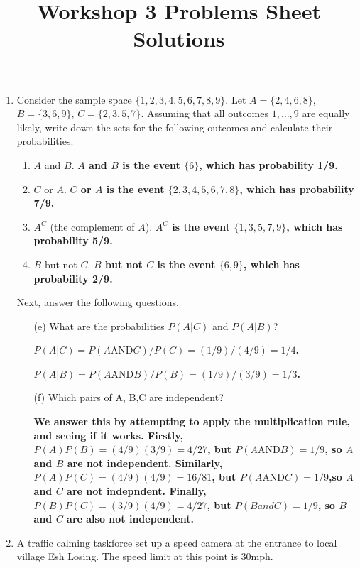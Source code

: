 \documentclass[11pt,a4paper]{article}
\title{Workshop 3 Problems Sheet Solutions}
\begin{document}
 

\setcounter{section}{1}
 



\begin{enumerate}

\item Consider the sample space $\{1, 2, 3, 4, 5, 6, 7, 8, 9\}$. Let $A = \{2, 4, 6, 8\}$, $B = \{3, 6, 9\}$, $C = \{2, 3, 5, 7\}$. Assuming that all outcomes $1,\ldots,9$ are equally likely, write down the sets for the following outcomes and calculate their probabilities.

\begin{enumerate}
\item $A$ and $B$.
\textbf{$A$ and $B$ is the event $\{6\}$, which has probability 1/9.}
\item $C$ or $A$.
\textbf{$C$ or $A$ is the event $\{2, 3, 4, 5, 6, 7, 8\}$, which has probability 7/9.}
\item $A^C$ (the complement of $A$).
\textbf{$A^C$ is the event $\{1, 3, 5, 7, 9\}$, which has probability 5/9.}
\item $B$ but not $C$.
\textbf{$B$ but not $C$ is the event $\{6, 9\}$, which has probability 2/9.}
\end{enumerate}

Next, answer the following questions.
\begin{enumerate}
\item[(e)] What are the probabilities $P(A|C)$ and $P(A|B)$?

\textbf{$P(A|C) = P (A \textrm{AND} C )/P (C ) = (1/9)/(4/9) = 1/4$.}

\textbf{$P(A|B) = P (A \textrm{AND} B )/P (B) = (1/9)/(3/9) = 1/3$.}

\item[(f)] Which pairs of A, B,C are independent?

\textbf{We answer this by attempting to apply the multiplication rule, and seeing if it works. Firstly, $P(A)P (B ) = (4/9)(3/9) = 4/27$, but $P (A \textrm{AND} B ) = 1/9$, so $A$ and $B$ are not independent. Similarly, $P (A)P (C ) = (4/9)(4/9) = 16/81$, but $P (A \textrm{AND} C ) = 1/9$,so $A$ and $C$ are not indepndent. Finally, $P (B )P (C ) = (3/9)(4/9) = 4/27$, but $P (B and C ) = 1/9$, so $B$ and $C$ are also not independent.}

\end{enumerate}

\item A traffic calming taskforce set up a speed camera at the entrance to local village Esh Losing. The speed limit at this point is 30mph.


\end{enumerate}
\end{document}

